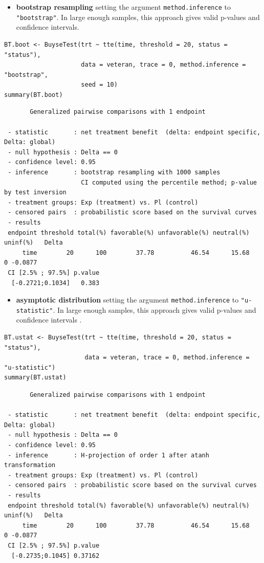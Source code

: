 \documentclass[12pt]{article}
\begin{document}
\begin{itemize}
\item \textbf{bootstrap resampling} setting the argument \texttt{method.inference} to
\texttt{"bootstrap"}. In large enough samples, this approach gives valid
p-values and confidence intervals.
\end{itemize}

\lstset{language=r,label= ,caption= ,captionpos=b,numbers=none}
\begin{lstlisting}
BT.boot <- BuyseTest(trt ~ tte(time, threshold = 20, status = "status"),
                     data = veteran, trace = 0, method.inference = "bootstrap",
                     seed = 10) 
summary(BT.boot)
\end{lstlisting}

\begin{verbatim}
       Generalized pairwise comparisons with 1 endpoint

 - statistic       : net treatment benefit  (delta: endpoint specific, Delta: global) 
 - null hypothesis : Delta == 0 
 - confidence level: 0.95 
 - inference       : bootstrap resampling with 1000 samples 
                     CI computed using the percentile method; p-value by test inversion 
 - treatment groups: Exp (treatment) vs. Pl (control) 
 - censored pairs  : probabilistic score based on the survival curves
 - results
 endpoint threshold total(%) favorable(%) unfavorable(%) neutral(%) uninf(%)   Delta
     time        20      100        37.78          46.54      15.68        0 -0.0877
 CI [2.5% ; 97.5%] p.value 
  [-0.2721;0.1034]   0.383
\end{verbatim}

\begin{itemize}
\item \textbf{asymptotic distribution} setting the argument \texttt{method.inference} to
\texttt{"u-statistic"}. In large enough samples, this approach gives valid
p-values and confidence intervals \citep{ozenne2021asymptotic}.
\end{itemize}

\lstset{language=r,label= ,caption= ,captionpos=b,numbers=none}
\begin{lstlisting}
BT.ustat <- BuyseTest(trt ~ tte(time, threshold = 20, status = "status"),
                      data = veteran, trace = 0, method.inference = "u-statistic") 
summary(BT.ustat)
\end{lstlisting}

\begin{verbatim}
       Generalized pairwise comparisons with 1 endpoint

 - statistic       : net treatment benefit  (delta: endpoint specific, Delta: global) 
 - null hypothesis : Delta == 0 
 - confidence level: 0.95 
 - inference       : H-projection of order 1 after atanh transformation 
 - treatment groups: Exp (treatment) vs. Pl (control) 
 - censored pairs  : probabilistic score based on the survival curves
 - results
 endpoint threshold total(%) favorable(%) unfavorable(%) neutral(%) uninf(%)   Delta
     time        20      100        37.78          46.54      15.68        0 -0.0877
 CI [2.5% ; 97.5%] p.value 
  [-0.2735;0.1045] 0.37162
\end{verbatim}
\end{document}
